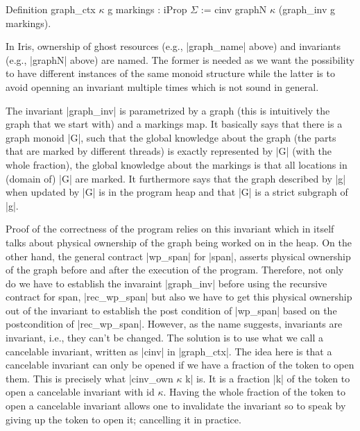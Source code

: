 \documentclass[nocopyrightspace]{sigplanconf}
\begin{document}
\begin{Coq}
Definition graph_ctx $\kappa$ g markings : iProp $\Sigma$ := 
  cinv graphN $\kappa$ (graph_inv g markings).
\end{Coq}

In Iris, ownership of ghost resources (e.g., \Coqe|graph_name| above) and invariants (e.g., \Coqe|graphN| above) are named.
The former is needed as we want the possibility to have different
instances of the same monoid structure while the latter is to avoid
openning an invariant multiple times which is not sound in general.

The invariant \Coqe|graph_inv| is parametrized by a graph (this is
intuitively the graph that we start with) and a markings map.
It basically says that there is a graph monoid \Coqe|G|,
such that the global knowledge about the graph (the parts that are
marked by different threads) is exactly represented by \Coqe|G| (with the whole fraction), the global knowledge about the markings is that all
locations in (domain of) \Coqe|G| are marked.
It furthermore says that the graph described by \Coqe|g| when updated
by \Coqe|G| is in the program heap and that \Coqe|G| is a strict subgraph
of \Coqe|g|.

Proof of the correctness of the program relies on this invariant which
in itself talks about physical ownership of the graph being worked on
in the heap.
On the other hand, the general contract \Coqe|wp_span| for \Coqe|span|, 
asserts physical ownership of the graph before and after the execution of
the program.
Therefore, not only do we have to establish the invaraint \Coqe|graph_inv| before using the recursive contract for span, \Coqe|rec_wp_span|
but also we have to get this physical ownership out of the invariant to
establish the post condition of \Coqe|wp_span| based on the postcondition
of \Coqe|rec_wp_span|.
However, as the name suggests, invariants are invariant, i.e., they can't
be changed.
The solution is to use what we call a cancelable invariant, written as
\Coqe|cinv| in \Coqe|graph_ctx|.
The idea here is that a cancelable invariant can only be opened if we
have a fraction of the token to open them. This is precisely what
\Coqe|cinv_own $\kappa$ k| is. It is a fraction \Coqe|k| of the token
to open a cancelable invariant with id $\kappa$.
Having the whole fraction of the token to open a cancelable invariant
allows one to invalidate the invariant so to speak by giving up the
token to open it; cancelling it in practice.
\end{document}
